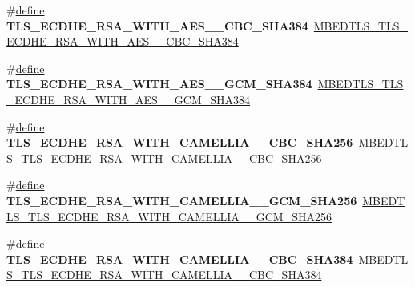 \begin{DoxyCompactItemize}
\item 
\mbox{\label{compat-1_83_8h_ab25ddd336d25df6621b1436be12450eb}} 
\#\hyperlink{structdefine}{define} {\bfseries T\+L\+S\+\_\+\+E\+C\+D\+H\+E\+\_\+\+R\+S\+A\+\_\+\+W\+I\+T\+H\+\_\+\+A\+E\+S\+\_\+\_\+\+C\+B\+C\+\_\+\+S\+H\+A384}~\hyperlink{ssl__ciphersuites_8h_aed277b98a024d972ffcbb8a41443ed8c}{M\+B\+E\+D\+T\+L\+S\+\_\+\+T\+L\+S\+\_\+\+E\+C\+D\+H\+E\+\_\+\+R\+S\+A\+\_\+\+W\+I\+T\+H\+\_\+\+A\+E\+S\+\_\+\_\+\+C\+B\+C\+\_\+\+S\+H\+A384}
\item 
\mbox{\label{compat-1_83_8h_a5d287e13f2484dd37398fa342fdef7b4}} 
\#\hyperlink{structdefine}{define} {\bfseries T\+L\+S\+\_\+\+E\+C\+D\+H\+E\+\_\+\+R\+S\+A\+\_\+\+W\+I\+T\+H\+\_\+\+A\+E\+S\+\_\+\_\+\+G\+C\+M\+\_\+\+S\+H\+A384}~\hyperlink{ssl__ciphersuites_8h_accc1a6f82abe98ed5b9377c9013514ce}{M\+B\+E\+D\+T\+L\+S\+\_\+\+T\+L\+S\+\_\+\+E\+C\+D\+H\+E\+\_\+\+R\+S\+A\+\_\+\+W\+I\+T\+H\+\_\+\+A\+E\+S\+\_\+\_\+\+G\+C\+M\+\_\+\+S\+H\+A384}
\item 
\mbox{\label{compat-1_83_8h_afae694ab832d209474875d2a55a5e202}} 
\#\hyperlink{structdefine}{define} {\bfseries T\+L\+S\+\_\+\+E\+C\+D\+H\+E\+\_\+\+R\+S\+A\+\_\+\+W\+I\+T\+H\+\_\+\+C\+A\+M\+E\+L\+L\+I\+A\+\_\+\_\+\+C\+B\+C\+\_\+\+S\+H\+A256}~\hyperlink{ssl__ciphersuites_8h_a17aafd00b4755df5d3358962ae77ce06}{M\+B\+E\+D\+T\+L\+S\+\_\+\+T\+L\+S\+\_\+\+E\+C\+D\+H\+E\+\_\+\+R\+S\+A\+\_\+\+W\+I\+T\+H\+\_\+\+C\+A\+M\+E\+L\+L\+I\+A\+\_\+\_\+\+C\+B\+C\+\_\+\+S\+H\+A256}
\item 
\mbox{\label{compat-1_83_8h_adbfcbf815464735c11cf38ae2a006ab7}} 
\#\hyperlink{structdefine}{define} {\bfseries T\+L\+S\+\_\+\+E\+C\+D\+H\+E\+\_\+\+R\+S\+A\+\_\+\+W\+I\+T\+H\+\_\+\+C\+A\+M\+E\+L\+L\+I\+A\+\_\+\_\+\+G\+C\+M\+\_\+\+S\+H\+A256}~\hyperlink{ssl__ciphersuites_8h_a1cef8735e16a7d976c676ae4a66ef2d6}{M\+B\+E\+D\+T\+L\+S\+\_\+\+T\+L\+S\+\_\+\+E\+C\+D\+H\+E\+\_\+\+R\+S\+A\+\_\+\+W\+I\+T\+H\+\_\+\+C\+A\+M\+E\+L\+L\+I\+A\+\_\+\_\+\+G\+C\+M\+\_\+\+S\+H\+A256}
\item 
\mbox{\label{compat-1_83_8h_a3b4d7bc3bb5754d6ad4238e9ccfcab92}} 
\#\hyperlink{structdefine}{define} {\bfseries T\+L\+S\+\_\+\+E\+C\+D\+H\+E\+\_\+\+R\+S\+A\+\_\+\+W\+I\+T\+H\+\_\+\+C\+A\+M\+E\+L\+L\+I\+A\+\_\+\_\+\+C\+B\+C\+\_\+\+S\+H\+A384}~\hyperlink{ssl__ciphersuites_8h_ab212aa3f9d2551530a74e5cfc26ee83c}{M\+B\+E\+D\+T\+L\+S\+\_\+\+T\+L\+S\+\_\+\+E\+C\+D\+H\+E\+\_\+\+R\+S\+A\+\_\+\+W\+I\+T\+H\+\_\+\+C\+A\+M\+E\+L\+L\+I\+A\+\_\+\_\+\+C\+B\+C\+\_\+\+S\+H\+A384}

\end{DoxyCompactItemize}

